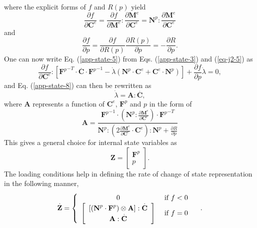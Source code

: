 where the explicit forms of $ f $ and $ R(p) $ yield
\begin{equation}\label{app-state-6}
\frac{\partial f}{\partial \textbf{C}^e}=\frac{\partial f}{\partial \textbf{M}^e}:\frac{\partial\textbf{M}^e}{\partial \textbf{C}^e}=\textbf{N}^p:\frac{\partial\textbf{M}^e}{\partial \textbf{C}^e}
\end{equation}
and 
\begin{equation}\label{app-state-7}
\frac{\partial f}{\partial p}=\frac{\partial f}{\partial R(p)}\frac{\partial R(p)}{\partial p}=-\frac{\partial R}{\partial p}.
\end{equation}
One can now write Eq. (\ref{app-state-5}) from Eqs. (\ref{app-state-3}) and (\ref{eq-j2-5}) as
\begin{equation}\label{app-state-8}
\frac{\partial f}{\partial \textbf{C}^e}:\left[{\textbf{F}^p}^{-T}\cdot\overset{.}{\textbf{C}}\cdot{\textbf{F}^p}^{-1}-\dot\lambda(\textbf{N}^p\cdot\textbf{C}^e+\textbf{C}^e\cdot\textbf{N}^p)\right]+\frac{\partial f}{\partial p}\dot\lambda=0,
\end{equation}
and Eq. (\ref{app-state-8}) can then be rewritten as 
\begin{equation}\label{app-state-9}
\dot\lambda=\textbf{A}:\overset{.}{\textbf{C}},
\end{equation}
where $ \textbf{A} $ represents a function of $ \textbf{C}^e $, $ \textbf{F}^p $ and $ p $ in the form of
\begin{equation}\label{app-state-10}
\textbf{A}=\frac{{\textbf{F}^p}^{-1}\cdot\left(\textbf{N}^p:\frac{\partial\textbf{M}^e}{\partial\textbf{C}^e}\right)\cdot{\textbf{F}^p}^{-T}}{\textbf{N}^p:\left(2\frac{\partial\textbf{M}^e}{\partial\textbf{C}^e}\cdot\textbf{C}^e\right):\textbf{N}^p+\frac{\partial R}{\partial p}}
\end{equation}
This gives a general choice for internal state variables as 
\begin{equation}\label{app-state-11}
\textbf{Z}=\left[
\begin{array}{c}
{\textbf{F}^p} \\ p
\end{array}
\right].
\end{equation}
The loading conditions help in defining the rate of change of state representation in the following manner,
\begin{equation}\label{app-state-12}
\overset{.}{\textbf{Z}} = 
\begin{cases}
	\begin{array}{c c}
		0 & \text{ if }f<0 \\
		\left[
			\begin{array}{c}
				\left[\left(\textbf{N}^p\cdot\textbf{F}^p\right)\otimes\textbf{A}\right]:\overset{.}{\textbf{C}} \\
				\textbf{A}:\overset{.}{\textbf{C}}
			\end{array}
		\right] & \text{ if }f=0
	\end{array}
\end{cases}.
\end{equation}

